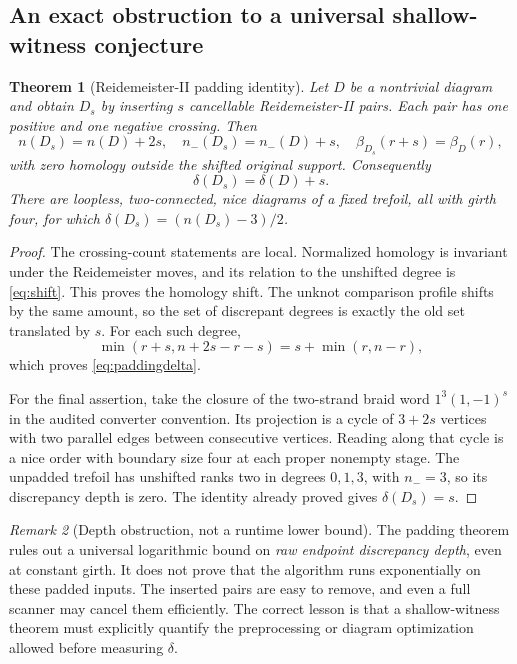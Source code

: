 \documentclass[11pt]{article}
\newtheorem{theorem}{Theorem}[section]
\theoremstyle{definition}\newtheorem{definition}[theorem]{Definition}
\theoremstyle{remark}\newtheorem{remark}[theorem]{Remark}
\begin{document}
\subsection{An exact obstruction to a universal shallow-witness conjecture}
\begin{theorem}[Reidemeister-II padding identity]\label{thm:padding}
Let $D$ be a nontrivial diagram and obtain $D_s$ by inserting $s$ cancellable Reidemeister-II pairs. Each pair has one positive and one negative crossing. Then
\[
 n(D_s)=n(D)+2s,\quad n_-(D_s)=n_-(D)+s,\quad
 \beta_{D_s}(r+s)=\beta_D(r),
\]
with zero homology outside the shifted original support. Consequently
\begin{equation}
 \delta(D_s)=\delta(D)+s.\label{eq:paddingdelta}
\end{equation}
There are loopless, two-connected, nice diagrams of a fixed trefoil, all with girth four, for which $\delta(D_s)=(n(D_s)-3)/2$.
\end{theorem}
\begin{proof}
The crossing-count statements are local. Normalized homology is invariant under the Reidemeister moves, and its relation to the unshifted degree is \eqref{eq:shift}. This proves the homology shift. The unknot comparison profile shifts by the same amount, so the set of discrepant degrees is exactly the old set translated by $s$. For each such degree,
\[
 \min(r+s,n+2s-r-s)=s+\min(r,n-r),
\]
which proves \eqref{eq:paddingdelta}.

For the final assertion, take the closure of the two-strand braid word
$1^3(1,-1)^s$ in the audited converter convention. Its projection is a cycle of $3+2s$ vertices with two parallel edges between consecutive vertices. Reading along that cycle is a nice order with boundary size four at each proper nonempty stage. The unpadded trefoil has unshifted ranks two in degrees $0,1,3$, with $n_-=3$, so its discrepancy depth is zero. The identity already proved gives $\delta(D_s)=s$.
\end{proof}

\begin{remark}[Depth obstruction, not a runtime lower bound]
The padding theorem rules out a universal logarithmic bound on \emph{raw endpoint discrepancy depth}, even at constant girth. It does not prove that the algorithm runs exponentially on these padded inputs. The inserted pairs are easy to remove, and even a full scanner may cancel them efficiently. The correct lesson is that a shallow-witness theorem must explicitly quantify the preprocessing or diagram optimization allowed before measuring $\delta$.
\end{remark}
\end{document}
